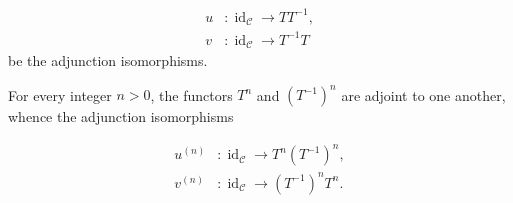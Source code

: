 \begin{equation}
  \begin{aligned}
    u&\colon\operatorname{id}_{\mathcal C}\longrightarrow TT^{-1},\\
    v&\colon\operatorname{id}_{\mathcal C}\longrightarrow T^{-1}T
  \end{aligned}
  \tag{1.5.14.1}
\end{equation}
be the adjunction isomorphisms.

For every integer $n>0$, the functors $T^n$ and $(T^{-1})^n$ are
adjoint to one another, whence the adjunction isomorphisms

\begin{equation}
  \begin{aligned}
    u^{(n)}&\colon\operatorname{id}_{\mathcal C}
      \longrightarrow T^n(T^{-1})^n,\\
    v^{(n)}&\colon\operatorname{id}_{\mathcal C}
      \longrightarrow (T^{-1})^nT^n.
  \end{aligned}
  \tag{1.5.14.2}
\end{equation}
